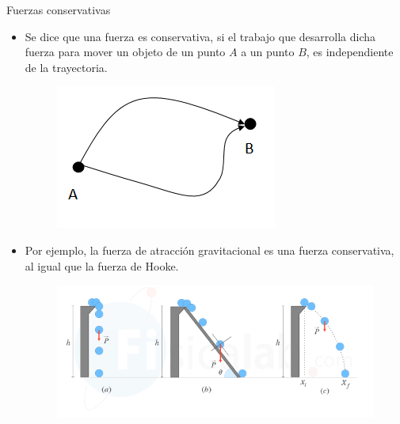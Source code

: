     \begin{frame}{Fuerzas conservativas}
    
        \begin{itemize}
        \pause \item Se dice que una fuerza es conservativa, si el trabajo que desarrolla dicha fuerza para mover un objeto de un punto $A$ a un punto $B$, es independiente de la trayectoria.
        
        \begin{figure}
            \centering
            \includegraphics[scale=0.3]{figures/FNC.png}
        \end{figure}
        
        \pause \item Por ejemplo, la fuerza de atracción gravitacional es una fuerza conservativa, al igual que la fuerza de Hooke.
        
        \begin{figure}
            \centering
            \includegraphics[scale=1.3]{figures/FCONS.png}
        \end{figure}
        \end{itemize}
        
    \end{frame}
    

